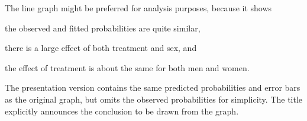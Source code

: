The line graph might be preferred for analysis purposes, because it
shows
\begin{seriate}
\item the observed and fitted probabilities are quite similar,
\item there is a large effect of both treatment and sex, and
\item the effect of treatment is about the same for both men and women.
\end{seriate}
The presentation version contains the same predicted probabilities and error
bars as the original graph, but omits the observed probabilities
for simplicity.
The title explicitly
announces the conclusion to be drawn from the graph.


